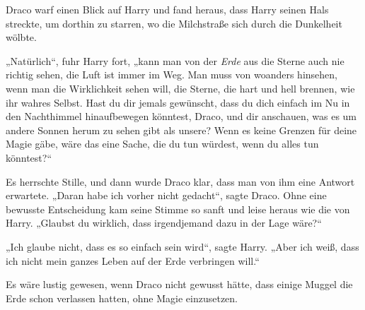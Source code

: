 Draco warf einen Blick auf Harry und fand heraus, dass Harry seinen Hals streckte, um dorthin zu starren, wo die Milchstraße sich durch die Dunkelheit wölbte.

„Natürlich“, fuhr Harry fort, „kann man von der \emph{Erde} aus die Sterne auch nie richtig sehen, die Luft ist immer im Weg. Man muss von woanders hinsehen, wenn man die Wirklichkeit sehen will, die Sterne, die hart und hell brennen, wie ihr wahres Selbst. Hast du dir jemals gewünscht, dass du dich einfach im Nu in den Nachthimmel hinaufbewegen könntest, Draco, und dir anschauen, was es um andere Sonnen herum zu sehen gibt als unsere? Wenn es keine Grenzen für deine Magie gäbe, wäre das eine Sache, die du tun würdest, wenn du alles tun könntest?“

Es herrschte Stille, und dann wurde Draco klar, dass man von ihm eine Antwort erwartete.
„Daran habe ich vorher nicht gedacht“, sagte Draco. Ohne eine bewusste Entscheidung kam seine Stimme so sanft und leise heraus wie die von Harry.
„Glaubst du wirklich, dass irgendjemand dazu in der Lage wäre?“

„Ich glaube nicht, dass es so einfach sein wird“, sagte Harry.
„Aber ich weiß, dass ich nicht mein ganzes Leben auf der Erde verbringen will.“

Es wäre lustig gewesen, wenn Draco nicht gewusst hätte, dass einige Muggel die Erde schon verlassen hatten, ohne Magie einzusetzen.

